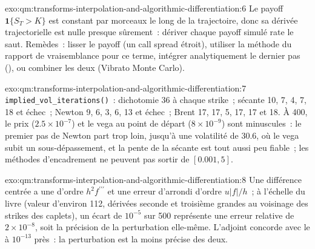 \begin{solution}{exo:qm:transforms-interpolation-and-algorithmic-differentiation:6}
Le payoff $\mathbf 1\{S_T > K\}$ est constant par morceaux le long de la trajectoire, donc sa dérivée trajectorielle est nulle presque sûrement~: dériver chaque payoff simulé rate le saut. Remèdes~: lisser le payoff (un
call spread étroit), utiliser la méthode du rapport de vraisemblance pour ce terme, intégrer analytiquement le dernier pas (), ou combiner les deux (Vibrato Monte Carlo).
\end{solution}

\begin{solution}{exo:qm:transforms-interpolation-and-algorithmic-differentiation:7}
\texttt{implied\_vol\_iterations()}~: dichotomie 36 à chaque strike~; sécante 10, 7, 4, 7, 18 et échec~; Newton 9, 6, 3, 6, 13 et échec~; Brent 17, 17, 5, 17, 17 et 18. À 400, le prix
($2.5 \times 10^{-7}$) et le vega au point de départ ($8 \times 10^{-9}$) sont minuscules~: le premier pas de Newton part trop loin, jusqu'à une volatilité de 30.6, où le vega subit un sous-dépassement, et la pente de la sécante est tout aussi
peu fiable~; les méthodes d'encadrement ne peuvent pas sortir de $[0.001, 5]$.
\end{solution}

\begin{solution}{exo:qm:transforms-interpolation-and-algorithmic-differentiation:8}
Une différence centrée a une  d'ordre $h^2f^{\prime\prime\prime}$ et une erreur d'arrondi d'ordre $u|f|/h$~; à l'échelle du livre (valeur d'environ 112, dérivées seconde et troisième grandes au voisinage des strikes des caplets), un
écart de $10^{-5}$ sur 500 représente une erreur relative de $2 \times 10^{-8}$, soit la précision de la perturbation elle-même. L'adjoint concorde avec le  à $10^{-13}$ près~: la perturbation est la moins précise des deux.
\end{solution}

